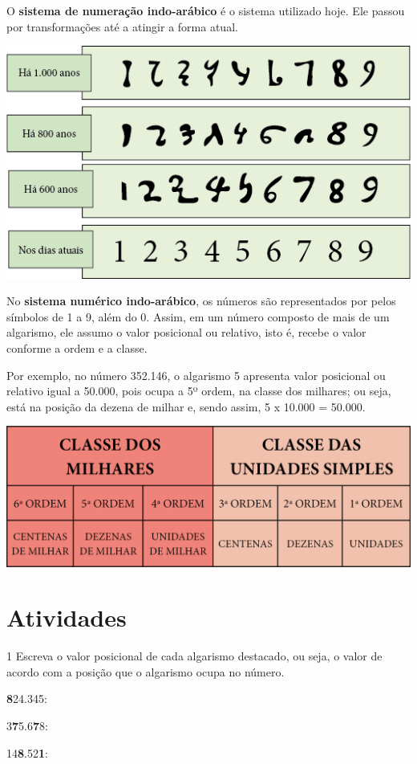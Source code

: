{O \textbf{sistema de numeração indo-arábico} é o sistema utilizado hoje. 
Ele passou por transformações até a atingir a forma atual.\bigskip

\includegraphics[width=.8\textwidth]{media/image5.png}\bigskip

No \textbf{sistema numérico indo-arábico}, os números são representados por 
pelos símbolos de 1 a 9, além do 0. Assim, em um número composto de mais
de um algarismo, ele assumo o valor posicional ou relativo, isto é, recebe 
o valor conforme a ordem e a classe. 

Por exemplo, no número 352.146, o algarismo 5 apresenta valor posicional ou
relativo igual a 50.000, pois ocupa a 5º ordem, na classe dos milhares; 
ou seja, está na posição da dezena de milhar e, sendo assim, 5 x 10.000 = 50.000.

\includegraphics[width=\textwidth]{media/image1.png}\bigskip
}

\section*{Atividades}

\num{1} Escreva o valor posicional de cada algarismo
destacado, ou seja, o valor de acordo com a posição
que o algarismo ocupa no número.\enlargethispage{2\baselineskip}

\begin{escolha}
\item \textbf{8}24.345: 

\item 3\textbf{7}5.6\textbf{7}8: 

\item 14\textbf{8}.52\textbf{1}:
\end{escolha}

